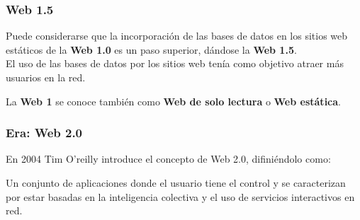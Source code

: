 \documentclass[
10pt, %
aspectratio=169, %
]{beamer}
\begin{document}
	\begin{frame}
		
		\frametitle{Web 1.5}
		
		Puede considerarse que la incorporación de las bases de datos en los sitios web estáticos de la \textbf{Web 1.0} es un paso superior, dándose la \textbf{Web 1.5}.\\[2mm]
		
		El uso de las bases de datos por los sitios web tenía como objetivo atraer más usuarios en la red. 
		
		\pause
		\vspace{3\baselineskip}
		
		La \textbf{Web 1} se conoce también como \textbf{Web de solo lectura} o \textbf{Web estática}.
		
	\end{frame}
	
	\begin{frame}
		
		\frametitle{Era: Web 2.0}
		
		En 2004 Tim O'reilly introduce el concepto de Web 2.0, difiniéndolo como:
		
		\begin{alertblock}{}
			Un conjunto de aplicaciones donde el usuario tiene el control y se caracterizan por estar basadas en la inteligencia colectiva y el uso de servicios interactivos en red.
		\end{alertblock}
		

		
	\end{frame}
	
\end{document}
